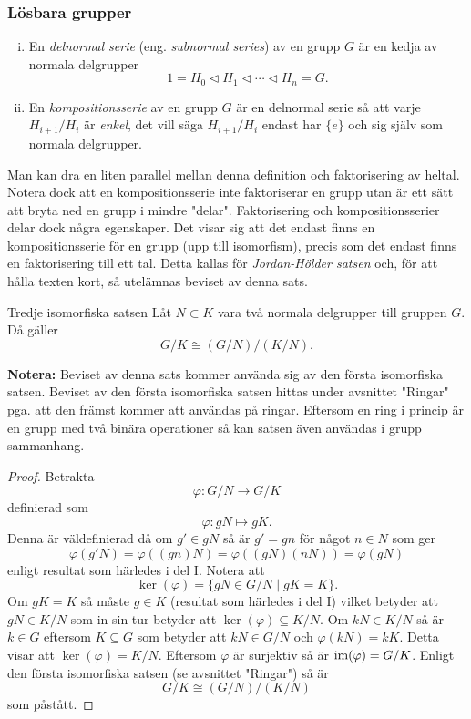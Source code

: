 \documentclass{article}
\newcommand{\im}[0]{\textnormal{im}}
\theoremstyle{definition}
\begin{document}
\subsubsection{Lösbara grupper}
\begin{mydef}{}{}
  \begin{enumerate}[(i)]
    \item En \textit{delnormal serie} (eng. \textit{subnormal series}) av en grupp $G$ är en kedja av normala delgrupper
    \[1 = H_0 \triangleleft H_1 \triangleleft \cdots \triangleleft H_n = G.\]
    \item En \textit{kompositionsserie} av en grupp $G$ är en delnormal serie 
    så att varje $H_{i+1}/H_i$ är \textit{enkel}, det vill säga $H_{i+1}/H_i$ endast har $\{e\}$ och sig själv som normala delgrupper.
  \end{enumerate}
\end{mydef}
Man kan dra en liten parallel mellan denna definition och faktorisering av heltal. Notera dock att en kompositionsserie inte faktoriserar 
en grupp utan är ett sätt att bryta ned en grupp i mindre "delar". Faktorisering och kompositionsserier delar dock några egenskaper. 
Det visar sig att det endast finns en kompositionsserie för en grupp (upp till isomorfism), precis som det endast finns en 
faktorisering till ett tal. Detta kallas för \textit{Jordan-Hölder satsen} och, för att hålla texten kort, så utelämnas beviset av denna sats.

\hypertarget{tredje isomorfiska satsen}{}
\begin{mytheo}{Tredje isomorfiska satsen}{}
  Låt $N \subset K$ vara två normala delgrupper till gruppen $G$. Då gäller 
  \[G/K \cong (G/N)/(K/N).\]
\end{mytheo}
\textbf{Notera:} Beviset av denna sats kommer använda sig av den första isomorfiska satsen. Beviset av den första isomorfiska satsen 
hittas under avsnittet "Ringar" pga. att den främst kommer att användas på ringar. Eftersom en ring i princip är en grupp med två binära operationer 
så kan satsen även användas i grupp sammanhang. 

\begin{proof}
  Betrakta 
  \[\varphi: G/N \rightarrow G/K\]
  definierad som 
  \[\varphi: gN \mapsto gK.\]
  Denna är väldefinierad då om $g' \in gN$ så är $g' = gn$ för något $n \in N$ som ger 
  \[\varphi(g'N) = \varphi((gn)N) = \varphi( (gN)(nN) ) = \varphi(gN)\]
  enligt resultat som härledes i del I. Notera att 
  \[\ker(\varphi) = \{gN \in G/N \; | \; gK = K \}.\]
  Om $gK = K$ så måste $g \in K$ (resultat som härledes i del I) vilket betyder att $gN \in K/N$ som in sin tur betyder att 
  $\ker(\varphi) \subseteq K/N$.
  Om $kN \in K/N$ så är $k \in G$ eftersom $K \subseteq G$ som betyder att $kN \in G/N$ och $\varphi(kN) = kK$. 
  Detta visar att $\ker(\varphi) = K/N.$ Eftersom $\varphi$ är surjektiv så är $\im(\varphi) = G/K$. Enligt 
  den första isomorfiska satsen (se avsnittet "Ringar") så är 
  \[G/K \cong (G/N)/(K/N)\]
  som påstått.
\end{proof}
\end{document}
